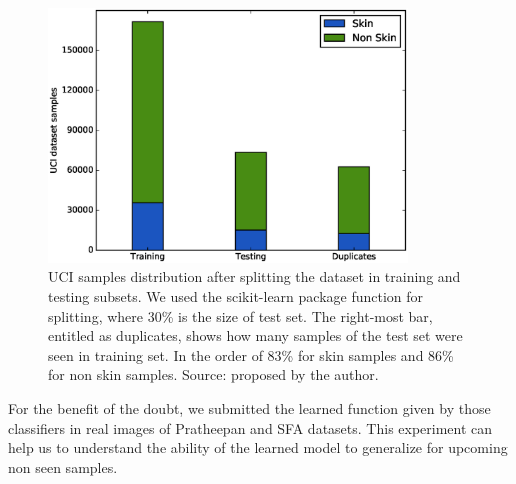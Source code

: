 \begin{figure}[H]
    \centering
    \includegraphics[width=0.85\textwidth]{figuras/uci_split_representation}

    \caption[UCI samples distribution after splitting the dataset in training and testing subsets]{UCI samples distribution after splitting the dataset in training and testing subsets. We used the scikit-learn package function for splitting, where 30\% is the size of test set. The right-most bar, entitled as duplicates, shows how many samples of the test set were seen in training set. In the order of 83\% for skin samples and 86\% for non skin samples. Source: proposed by the author.}
    \label{fig:uci_split_representation}
\end{figure}

For the benefit of the doubt, we submitted the learned function given by those classifiers in real images of Pratheepan and SFA datasets. This experiment can help us to understand the ability of the learned model to generalize for upcoming non seen samples.

